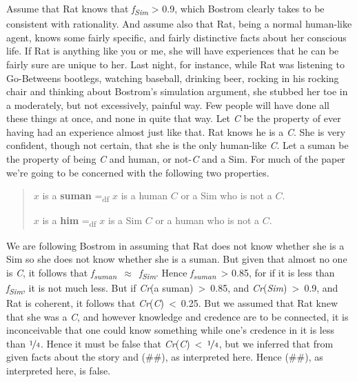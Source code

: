 Assume that Rat knows that \textit{f}\textit{\textsubscript{Sim}} {\textgreater} 0.9, which Bostrom clearly takes to be consistent with rationality. And assume also that Rat, being a normal human-like agent, knows some fairly specific, and fairly distinctive facts about her conscious life. If Rat is anything like you or me, she will have experiences that he can be fairly sure are unique to her. Last night, for instance, while Rat was listening to Go-Betweens bootlegs, watching baseball, drinking beer, rocking in his rocking chair and thinking about Bostrom's simulation argument, she stubbed her toe in a moderately, but not excessively, painful way. Few people will have done all these things at once, and none in quite that way. Let \textit{C} be the property of ever having had an experience almost just like that. Rat knows he is a \textit{C}. She is very confident, though not certain, that she is the only human-like \textit{C}. Let a suman be the property of being \textit{C} and human, or not-\textit{C} and a Sim. For much of the paper we're going to be concerned with the following two properties.

\begin{quote}
\(x\) is a \textbf{suman} =\textsubscript{df} \(x\) is a human \(C\) or a Sim who is not a \(C\).

\(x\) is a \textbf{him} =\textsubscript{df} \(x\) is a Sim \(C\) or a human who is not a \(C\).
\end{quote}

\noindent We are following Bostrom in assuming that Rat does not know whether she is a Sim so she does not know whether she is a suman. But given that almost no one is \textit{C}, it follows that \textit{f}\textit{\textsubscript{suman}}~${\approx}$~\textit{f}\textit{\textsubscript{Sim}}. Hence \textit{f}\textit{\textsubscript{suman}}~{\textgreater} 0.85, for if it is less than \textit{f}\textit{\textsubscript{Sim}}, it is not much less. But if \textit{Cr}(a suman)~{\textgreater}~0.85, and \textit{Cr}(\textit{Sim})~{\textgreater}~0.9, and Rat is coherent, it follows that \textit{Cr}(\textit{C})~{\textless}~0.25. But we assumed that Rat knew that she was a \textit{C}, and however knowledge and credence are to be connected, it is inconceivable that one could know something while one's credence in it is less than \(\nicefrac{1}{4}\). Hence it must be false that \textit{Cr}(\textit{C})~{\textless}~\(\nicefrac{1}{4}\), but we inferred that from given facts about the story and (\#\#), as interpreted here. Hence (\#\#), as interpreted here, is false.

